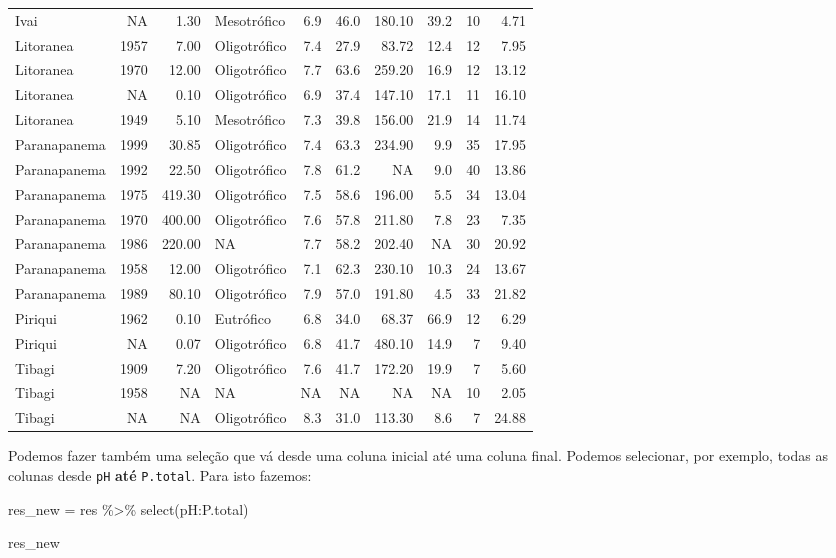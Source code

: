 \documentclass[
]{book}
\newenvironment{Shaded}{\begin{snugshade}}{\end{snugshade}}
\newcommand{\FunctionTok}[1]{\textcolor[rgb]{0.00,0.00,0.00}{#1}}
\newcommand{\NormalTok}[1]{#1}
\newcommand{\OtherTok}[1]{\textcolor[rgb]{0.56,0.35,0.01}{#1}}
\newcommand{\SpecialCharTok}[1]{\textcolor[rgb]{0.00,0.00,0.00}{#1}}
\begin{document}
\begin{table}
\begin{tabular}{lrrlrrrrrr}
Ivai & NA & 1.30 & Mesotrófico & 6.9 & 46.0 & 180.10 & 39.2 & 10 & 4.71\\
\addlinespace
Litoranea & 1957 & 7.00 & Oligotrófico & 7.4 & 27.9 & 83.72 & 12.4 & 12 & 7.95\\
Litoranea & 1970 & 12.00 & Oligotrófico & 7.7 & 63.6 & 259.20 & 16.9 & 12 & 13.12\\
Litoranea & NA & 0.10 & Oligotrófico & 6.9 & 37.4 & 147.10 & 17.1 & 11 & 16.10\\
Litoranea & 1949 & 5.10 & Mesotrófico & 7.3 & 39.8 & 156.00 & 21.9 & 14 & 11.74\\
Paranapanema & 1999 & 30.85 & Oligotrófico & 7.4 & 63.3 & 234.90 & 9.9 & 35 & 17.95\\
\addlinespace
Paranapanema & 1992 & 22.50 & Oligotrófico & 7.8 & 61.2 & NA & 9.0 & 40 & 13.86\\
Paranapanema & 1975 & 419.30 & Oligotrófico & 7.5 & 58.6 & 196.00 & 5.5 & 34 & 13.04\\
Paranapanema & 1970 & 400.00 & Oligotrófico & 7.6 & 57.8 & 211.80 & 7.8 & 23 & 7.35\\
Paranapanema & 1986 & 220.00 & NA & 7.7 & 58.2 & 202.40 & NA & 30 & 20.92\\
Paranapanema & 1958 & 12.00 & Oligotrófico & 7.1 & 62.3 & 230.10 & 10.3 & 24 & 13.67\\
\addlinespace
Paranapanema & 1989 & 80.10 & Oligotrófico & 7.9 & 57.0 & 191.80 & 4.5 & 33 & 21.82\\
Piriqui & 1962 & 0.10 & Eutrófico & 6.8 & 34.0 & 68.37 & 66.9 & 12 & 6.29\\
Piriqui & NA & 0.07 & Oligotrófico & 6.8 & 41.7 & 480.10 & 14.9 & 7 & 9.40\\
Tibagi & 1909 & 7.20 & Oligotrófico & 7.6 & 41.7 & 172.20 & 19.9 & 7 & 5.60\\
Tibagi & 1958 & NA & NA & NA & NA & NA & NA & 10 & 2.05\\
\addlinespace
Tibagi & NA & NA & Oligotrófico & 8.3 & 31.0 & 113.30 & 8.6 & 7 & 24.88\\
\bottomrule
\end{tabular}
\endgroup{}
\end{table}

Podemos fazer também uma seleção que vá desde uma coluna inicial até uma coluna final. Podemos selecionar, por exemplo, todas as colunas desde \texttt{pH} \textbf{até} \texttt{P.total}. Para isto fazemos:

\begin{Shaded}
\begin{Highlighting}[]
\NormalTok{res\_new }\OtherTok{=}\NormalTok{ res }\SpecialCharTok{\%\textgreater{}\%} 
  \FunctionTok{select}\NormalTok{(pH}\SpecialCharTok{:}\NormalTok{P.total)}

\NormalTok{res\_new}
\end{Highlighting}
\end{Shaded}
\end{document}
